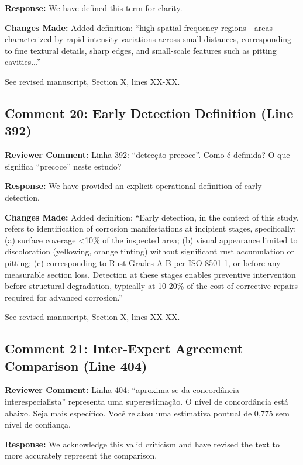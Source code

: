 \documentclass[11pt]{article}
\newcommand{\reviewercomment}[1]{\textcolor{reviewercolor}{\textbf{Reviewer Comment:} #1}}
\newcommand{\response}[1]{\textcolor{responsecolor}{\textbf{Response:} #1}}
\newcommand{\change}[1]{\textcolor{changecolor}{\textbf{Changes Made:} #1}}
\begin{document}
\response{We have defined this term for clarity.}

\change{Added definition: ``high spatial frequency regions—areas characterized by rapid intensity variations across small distances, corresponding to fine textural details, sharp edges, and small-scale features such as pitting cavities...''

See revised manuscript, Section X, lines XX-XX.}

\subsection{Comment 20: Early Detection Definition (Line 392)}

\reviewercomment{Linha 392: ``detecção precoce''. Como é definida? O que significa ``precoce'' neste estudo?}

\response{We have provided an explicit operational definition of early detection.}

\change{Added definition: ``Early detection, in the context of this study, refers to identification of corrosion manifestations at incipient stages, specifically: (a) surface coverage <10\% of the inspected area; (b) visual appearance limited to discoloration (yellowing, orange tinting) without significant rust accumulation or pitting; (c) corresponding to Rust Grades A-B per ISO 8501-1, or before any measurable section loss. Detection at these stages enables preventive intervention before structural degradation, typically at 10-20\% of the cost of corrective repairs required for advanced corrosion.''

See revised manuscript, Section X, lines XX-XX.}

\subsection{Comment 21: Inter-Expert Agreement Comparison (Line 404)}

\reviewercomment{Linha 404: ``aproxima-se da concordância interespecialista'' representa uma superestimação. O nível de concordância está abaixo. Seja mais específico. Você relatou uma estimativa pontual de 0,775 sem nível de confiança.}

\response{We acknowledge this valid criticism and have revised the text to more accurately represent the comparison.}
\end{document}

